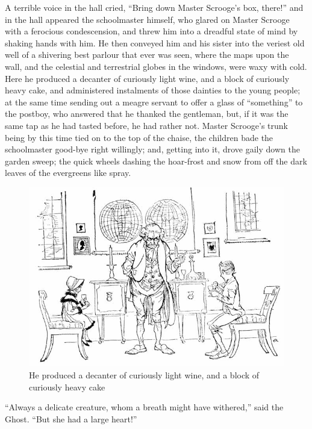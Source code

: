\documentclass[paper=5.5in:8.5in,BCOR=5mm,twoside,DIV=calc,12pt,usegeometry]{scrbook} %
\begin{document}
A terrible voice in the hall cried, \enquote{Bring down Master Scrooge's box, there!} and in the hall appeared the schoolmaster himself, who glared on Master Scrooge with a ferocious condescension, and threw him into a dreadful state of mind by shaking hands with him. He then conveyed him and his sister into the veriest old well of a shivering best parlour that ever was seen, where the maps upon the wall, and the celestial and terrestrial globes in the windows, were waxy with cold. Here he produced a decanter of curiously light wine, and a block of curiously heavy cake, and administered instalments of those dainties to the young people; at the same time sending out a meagre servant to offer a glass of \enquote{something} to the postboy, who answered that he thanked the gentleman, but, if it was the same tap as he had tasted before, he had rather not. Master Scrooge's trunk being by this time tied on to the top of the chaise, the children bade the schoolmaster good-bye right willingly; and, getting into it, drove gaily down the garden sweep; the quick wheels dashing the hoar-frost and snow from off the dark leaves of the evergreens like spray.

\begin{figure}[tbph]
\begin{minipage}[c]{\linewidth}
\includegraphics[width=\linewidth]{gs069}
\caption*{He produced a decanter of curiously light wine, and a block of curiously heavy cake}
\end{minipage}
\end{figure}

\enquote{Always a delicate creature, whom a breath might have withered,} said the Ghost. \enquote{But she had a large heart!}
\end{document}
